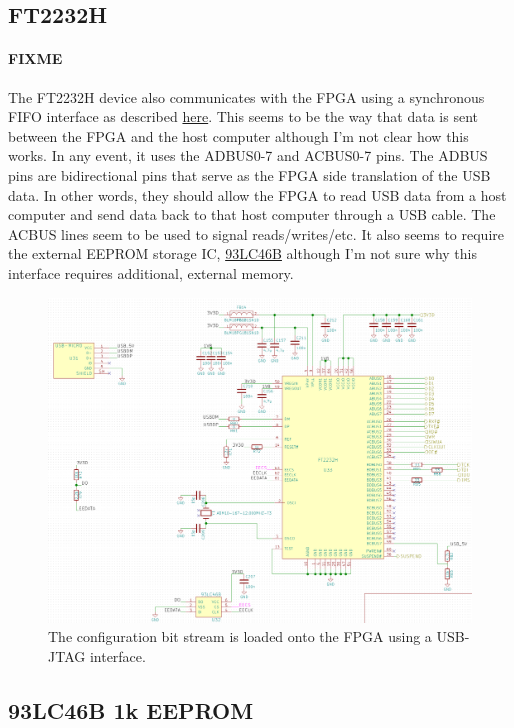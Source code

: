 \subsection{FT2232H}
\label{sec:ft2232h}

\paragraph{FIXME} The FT2232H device also communicates with the FPGA using a synchronous FIFO
interface as described
\href{http://www.ftdichip.com/Support/Documents/AppNotes/AN_130_FT2232H_Used_In_FT245\%20Synchronous\%20FIFO\%20Mode.pdf}{here}. This
seems to be the way that data is sent between the FPGA and the host computer although I'm not
clear how this works. In any event, it uses the ADBUS0-7 and ACBUS0-7 pins. The ADBUS pins
are bidirectional pins that serve as the FPGA side translation of the USB data. In other words,
they should allow the FPGA to read USB data from a host computer and send data back to that host
computer through a USB cable. The ACBUS lines seem to be used to signal reads/writes/etc. It also
seems to require the external EEPROM storage IC,
\href{http://ww1.microchip.com/downloads/en/DeviceDoc/20001749K.pdf}{93LC46B} although I'm not sure
why this interface requires additional, external memory.

\begin{figure}[h]
  \centering
  \includegraphics[width=\textwidth]{data/usb-ft2232.png}
  \caption{The configuration bit stream is loaded onto the FPGA using a USB-JTAG interface.}
  \label{fig:usb_ft2232}
\end{figure}

\subsection{93LC46B 1k EEPROM}
\label{sec:93lc46b}
